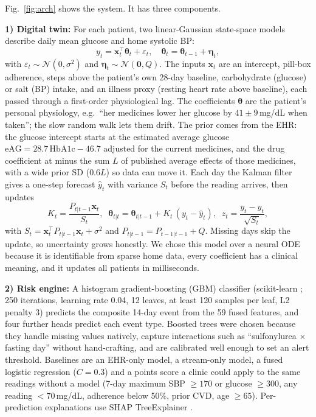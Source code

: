 \documentclass[conference]{IEEEtran}
\begin{document}
Fig.~\ref{fig:arch} shows the system. It has three components.

\textbf{1) Digital twin:} For each patient, two linear-Gaussian state-space models describe daily mean glucose and home systolic BP:
\begin{equation}
y_t = \mathbf{x}_t^{\top}\boldsymbol{\theta}_t + \varepsilon_t,\quad \boldsymbol{\theta}_t=\boldsymbol{\theta}_{t-1}+\boldsymbol{\eta}_t,
\label{eq:ssm}
\end{equation}
with $\varepsilon_t\sim\mathcal N(0,\sigma^2)$ and $\boldsymbol\eta_t\sim\mathcal N(\mathbf 0,Q)$. The inputs $\mathbf x_t$ are an intercept, pill-box adherence, steps above the patient's own 28-day baseline, carbohydrate (glucose) or salt (BP) intake, and an illness proxy (resting heart rate above baseline), each passed through a first-order physiological lag. The coefficients $\boldsymbol\theta$ are the patient's personal physiology, e.g.\ ``her medicines lower her glucose by $41\pm9$\,mg/dL when taken''; the slow random walk lets them drift. The prior comes from the EHR: the glucose intercept starts at the estimated average glucose $\mathrm{eAG}=28.7\,\mathrm{HbA1c}-46.7$ \cite{nathan2008} adjusted for the current medicines, and the drug coefficient at minus the sum $L$ of published average effects of those medicines, with a wide prior SD ($0.6L$) so data can move it. Each day the Kalman filter \cite{kalman1960} gives a one-step forecast $\hat y_t$ with variance $S_t$ before the reading arrives, then updates
\begin{equation}
K_t=\frac{P_{t|t-1}\mathbf x_t}{S_t},\;\;
\boldsymbol\theta_{t|t}=\boldsymbol\theta_{t|t-1}+K_t\,(y_t-\hat y_t),\;\;
z_t=\frac{y_t-\hat y_t}{\sqrt{S_t}},
\end{equation}
with $S_t=\mathbf x_t^\top P_{t|t-1}\mathbf x_t+\sigma^2$ and $P_{t|t-1}=P_{t-1|t-1}+Q$. Missing days skip the update, so uncertainty grows honestly. We chose this model over a neural ODE because it is identifiable from sparse home data, every coefficient has a clinical meaning, and it updates all patients in milliseconds.

\textbf{2) Risk engine:} A histogram gradient-boosting (GBM) classifier \cite{friedman2001,ke2017} (scikit-learn \cite{pedregosa2011}; 250 iterations, learning rate 0.04, 12 leaves, at least 120 samples per leaf, L2 penalty 3) predicts the composite 14-day event from the 59 fused features, and four further heads predict each event type. Boosted trees were chosen because they handle missing values natively, capture interactions such as ``sulfonylurea $\times$ fasting day'' without hand-crafting, and are calibrated well enough to set an alert threshold. Baselines are an EHR-only model, a stream-only model, a fused logistic regression ($C=0.3$) and a points score a clinic could apply to the same readings without a model (7-day maximum SBP $\ge170$ or glucose $\ge300$, any reading $<70$\,mg/dL, adherence below 50\%, prior CVD, age $\ge65$). Per-prediction explanations use SHAP TreeExplainer \cite{lundberg2017}.
\end{document}
